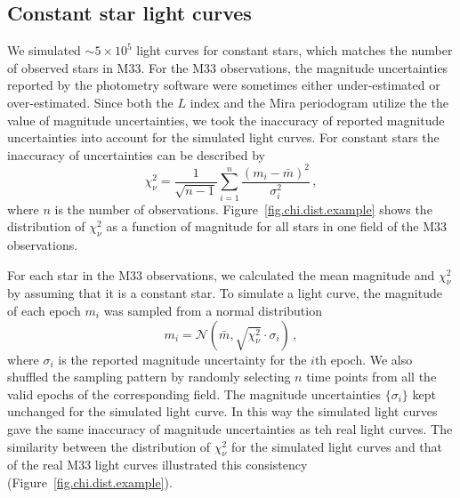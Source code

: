 \subsection{Constant star light curves}

We simulated $\sim 5\times 10^5$ light curves for constant stars, which matches the number of observed stars in M33. For the M33 observations, the magnitude uncertainties reported by the photometry software were sometimes either under-estimated or over-estimated. Since both the $L$ index and the Mira periodogram utilize the the value of magnitude uncertainties, we took the inaccuracy of reported magnitude uncertainties into account for the simulated light curves. For constant stars the inaccuracy of uncertainties can be described by
\begin{equation}
\chi_\nu^2 = \frac{1}{\sqrt{n-1}}\sum_{i=1}^n\frac{(m_i-\bar m)^2}{\sigma_i^2}\,,
\end{equation}
where $n$ is the number of observations. Figure~\ref{fig.chi.dist.example} shows the distribution of $\chi_\nu^2$ as a function of magnitude for all stars in one field of the M33 observations.

For each star in the M33 observations, we calculated the mean magnitude and $\chi_\nu^2$ by assuming that it is a constant star. To simulate a light curve, the magnitude of each epoch $m_i$ was sampled from a normal distribution
\begin{equation}
m_i = \mathcal{N}(\bar m,\sqrt{\chi_\nu^2}\cdot\sigma_i)\,,
\end{equation}
where $\sigma_i$ is the reported magnitude uncertainty for the $i$th epoch. We also shuffled the sampling pattern by randomly selecting $n$ time points from all the valid epochs of the corresponding field. The magnitude uncertainties $\{\sigma_i\}$ kept unchanged for the simulated light curve. In this way the simulated light curves gave the same inaccuracy of magnitude uncertainties as teh real light curves. The similarity between the distribution of $\chi_\nu^2$ for the simulated light curves and that of the real M33 light curves illustrated this consistency (Figure~\ref{fig.chi.dist.example}). 





